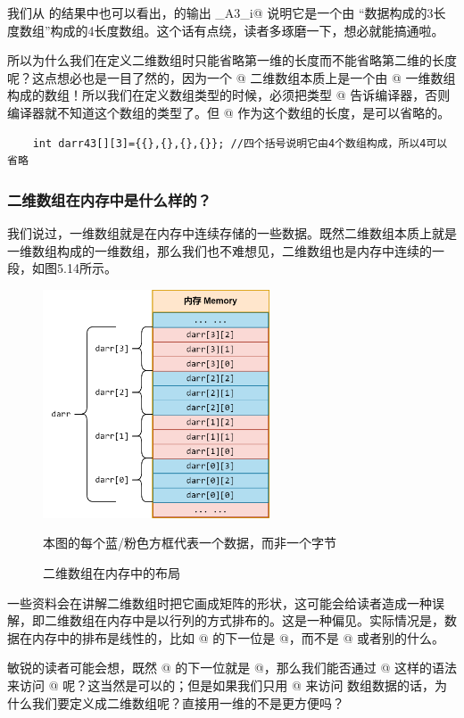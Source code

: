 我们从 \lstinline@typeid@ 的结果中也可以看出，\lstinline@darr@ 的输出 _A3_i@ 说明它是一个由 ``\lstinline@int@ 数据构成的3长度数组''构成的4长度数组。这个话有点绕，读者多琢磨一下，想必就能搞通啦。\par
所以为什么我们在定义二维数组时只能省略第一维的长度而不能省略第二维的长度呢？这点想必也是一目了然的，因为一个 \lstinline@int[4][3]@ 二维数组本质上是一个由 \lstinline@int[3]@ 一维数组构成的数组！所以我们在定义数组类型的时候，必须把类型 \lstinline@int[3]@ 告诉编译器，否则编译器就不知道这个数组的类型了。但 @ 作为这个数组的长度，是可以省略的。
\begin{lstlisting}
    int darr43[][3]={{},{},{},{}}; //四个括号说明它由4个数组构成，所以4可以省略
\end{lstlisting}\par
\subsubsection*{二维数组在内存中是什么样的？}
我们说过，一维数组就是在内存中连续存储的一些数据。既然二维数组本质上就是一维数组构成的一维数组，那么我们也不难想见，二维数组也是内存中连续的一段，如图5.14所示。\par
\begin{figure}[htbp]
    \centering
    \includegraphics[width=0.6\textwidth]{../images/generalized_parts/05_data_in_the_array_of_array.png}
    \caption{二维数组在内存中的布局}
    \footnotesize{本图的每个蓝/粉色方框代表一个数据，而非一个字节}
\end{figure}
一些资料会在讲解二维数组时把它画成矩阵的形状，这可能会给读者造成一种误解，即二维数组在内存中是以行列的方式排布的。这是一种偏见。实际情况是，数据在内存中的排布是线性的，比如 \lstinline@darr[0][3]@ 的下一位是 \lstinline@darr[1][0]@，而不是 \lstinline@darr[1][3]@ 或者别的什么。\par
敏锐的读者可能会想，既然 \lstinline@darr[0][3]@ 的下一位就是 \lstinline@darr[1][0]@，那么我们能否通过 \lstinline@darr[0][4]@ 这样的语法来访问 \lstinline@darr[1][0]@ 呢？这当然是可以的；但是如果我们只用 \lstinline@darr[0][i]@ 来访问 数组数据的话，为什么我们要定义成二维数组呢？直接用一维的不是更方便吗？\par
